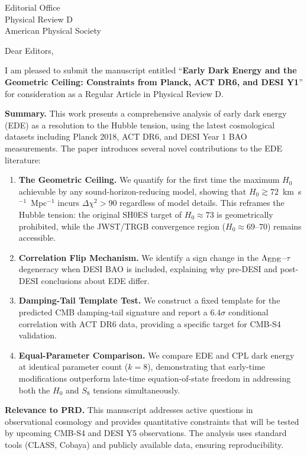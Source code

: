 \documentclass[11pt]{letter}
\begin{document}
\begin{letter}{Editorial Office\\Physical Review D\\American Physical Society}

\opening{Dear Editors,}

I am pleased to submit the manuscript entitled ``\textbf{Early Dark Energy and the Geometric Ceiling: Constraints from Planck, ACT DR6, and DESI Y1}'' for consideration as a Regular Article in Physical Review D.

\textbf{Summary.} This work presents a comprehensive analysis of early dark energy (EDE) as a resolution to the Hubble tension, using the latest cosmological datasets including Planck 2018, ACT DR6, and DESI Year 1 BAO measurements. The paper introduces several novel contributions to the EDE literature:

\begin{enumerate}
\item \textbf{The Geometric Ceiling.} We quantify for the first time the maximum $H_0$ achievable by any sound-horizon-reducing model, showing that $H_0 \gtrsim 72$~km~s$^{-1}$~Mpc$^{-1}$ incurs $\Delta\chi^2 > 90$ regardless of model details. This reframes the Hubble tension: the original SH0ES target of $H_0 \approx 73$ is geometrically prohibited, while the JWST/TRGB convergence region ($H_0 \approx 69$--$70$) remains accessible.

\item \textbf{Correlation Flip Mechanism.} We identify a sign change in the $\Lambda_{\rm EDE}$--$\tau$ degeneracy when DESI BAO is included, explaining why pre-DESI and post-DESI conclusions about EDE differ.

\item \textbf{Damping-Tail Template Test.} We construct a fixed template for the predicted CMB damping-tail signature and report a $6.4\sigma$ conditional correlation with ACT DR6 data, providing a specific target for CMB-S4 validation.

\item \textbf{Equal-Parameter Comparison.} We compare EDE and CPL dark energy at identical parameter count ($k=8$), demonstrating that early-time modifications outperform late-time equation-of-state freedom in addressing both the $H_0$ and $S_8$ tensions simultaneously.
\end{enumerate}

\textbf{Relevance to PRD.} This manuscript addresses active questions in observational cosmology and provides quantitative constraints that will be tested by upcoming CMB-S4 and DESI Y5 observations. The analysis uses standard tools (CLASS, Cobaya) and publicly available data, ensuring reproducibility.


\end{letter}
\end{document}
